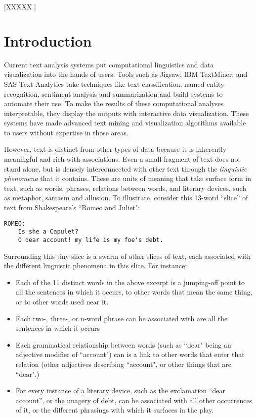 \documentclass{sig-alternate}
\begin{document}
[XXXXX ]



\section{Introduction}
Current text analysis systems put computational linguistics and data visualization into the hands of users. Tools such as Jigsaw, IBM TextMiner, and SAS Text Analytics take techniques like text classification, named-entity recognition, sentiment analysis and summarization and build systems to automate their use. To make the results of these computational analyses interpretable, they display the outputs with interactive data visualization. These systems have made advanced text mining and visualization algorithms available to users without expertise in those areas.

However, text is distinct from other types of data because it is inherently meaningful and rich with associations.  Even a small fragment of text does not stand alone, but is densely interconnected with other text through the \emph{linguistic phenomena} that it contains. These are units of meaning that take surface form in text, such as words, phrases, relations between words, and literary devices, such as metaphor, sarcasm and allusion. To illustrate, consider this 13-word ``slice'' of text from Shakespeare's ``Romeo and Juliet":

\begin{verbatim}
ROMEO:
    Is she a Capulet?
    O dear account! my life is my foe's debt.
\end{verbatim}

Surrounding this tiny slice is a swarm of other slices of text, each associated with the different linguistic phenomena in this slice. For instance:
\begin{itemize}
\item Each of the 11 distinct words in the above excerpt is a jumping-off point to all the sentences in which it occurs, to other words that mean the same thing, or to other words used near it.
\item Each  two-, three-, or n-word phrase can be associated with are all the sentences in which it occurs
\item  Each grammatical relationship between words (such as ``dear" being an adjective modifier of  ``account") can is a link to other words that enter that relation (other adjectives describing ``account", or other things that are ``dear".)
\item For every instance of a literary device, such as the exclamation ``dear account'', or the imagery of debt, can be associated with all other occurrences of it, or the different phrasings with which it surfaces in the play.
\end{itemize}
\end{document}
